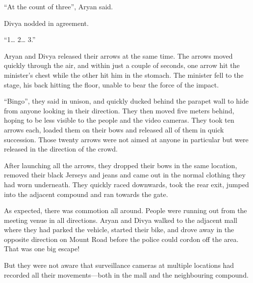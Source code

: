 “At the count of three”, Aryan said.

Divya nodded in agreement.

“1… 2… 3.”

Aryan and Divya released their arrows at the same time. The arrows moved quickly
through the air, and within just a couple of seconds, one arrow hit the minister's
chest while the other hit him in the stomach. The minister fell to the
stage, his back hitting the floor, unable to bear the force of the impact.

“Bingo”, they said in unison, and quickly ducked behind the parapet wall to hide
from anyone looking in their direction. They then moved five meters
behind, hoping to be less visible to the people and the video cameras. They took
ten arrows each, loaded them on their bows and released all of them in quick
succession. Those twenty arrows were not aimed at anyone in particular but were
released in the direction of the crowd.

After launching all the arrows, they dropped their bows in the same
location, removed their black Jerseys and jeans and came out in the normal
clothing they had worn underneath. They quickly raced downwards, took the rear
exit, jumped into the adjacent compound and ran towards the gate.

As expected, there was commotion all around. People were running out from the
meeting venue in all directions. Aryan and Divya walked to the adjacent mall
where they had parked the vehicle, started their bike, and drove away in the
opposite direction on Mount Road before the police could cordon off the
area. That was one big escape!

But they were not aware that surveillance cameras at multiple locations had
recorded all their movements—both in the mall and the neighbouring compound.